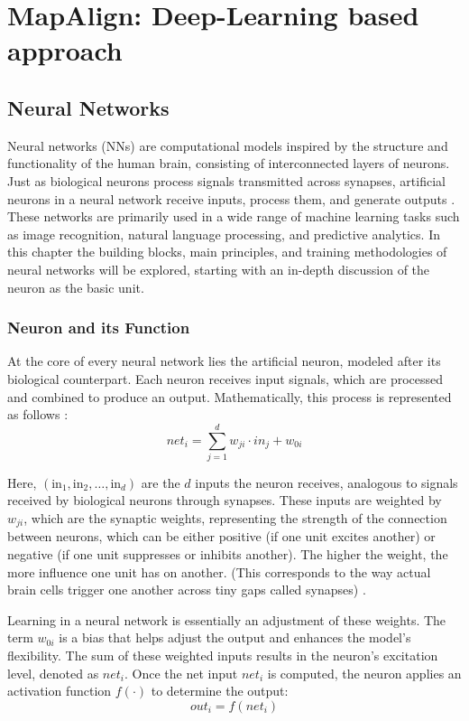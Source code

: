 \NoBgThispage
\chapter{MapAlign: Deep-Learning based approach}

\section{Neural Networks}
Neural networks (NNs) are computational models inspired by the structure and functionality of the human brain, consisting of interconnected layers of neurons. Just as biological neurons process signals transmitted across synapses, artificial neurons in a neural network receive inputs, process them, and generate outputs \cite{Grosan2011}. These networks are primarily used in a wide range of machine learning tasks such as image recognition, natural language processing, and predictive analytics.
In this chapter the building blocks, main principles, and training methodologies of neural networks will be explored, starting with an in-depth discussion of the neuron as the basic unit.

\subsection{Neuron and its Function}
At the core of every neural network lies the artificial neuron, modeled after its biological counterpart. Each neuron receives input signals, which are processed and combined to produce an output. Mathematically, this process is represented as follows \cite{10.11648/j.ajnna.20190501.12}:
\begin{equation}
    \textit{net}_i = \sum_{j=1}^{d} w_{ji} \cdot \textit{in}_j + w_{0i}
\end{equation}

Here, $(\text{in}_1, \text{in}_2, \ldots, \text{in}_d)$ are the $d$ inputs the neuron receives, analogous to signals received by biological neurons through synapses. These inputs are weighted by $w_{ji}$, which are the synaptic weights, representing the strength of the connection between neurons, which can be either positive (if one unit excites another) or negative (if one unit suppresses or inhibits another). The higher the weight, the more influence one unit has on another. (This corresponds to the way actual brain cells trigger one another across tiny gaps called synapses) \cite{10.11648/j.ajnna.20190501.12}.

Learning in a neural network is essentially an adjustment of these weights. The term $w_{0i}$ is a bias that helps adjust the output and enhances the model's flexibility. The sum of these weighted inputs results in the neuron’s excitation level, denoted as $\textit{net}_i$.
Once the net input ${net}_i$ is computed, the neuron applies an activation function $f(\cdot)$ to determine the output:
\begin{equation}
    \textit{out}_i = f(\textit{net}_i)
\end{equation}

